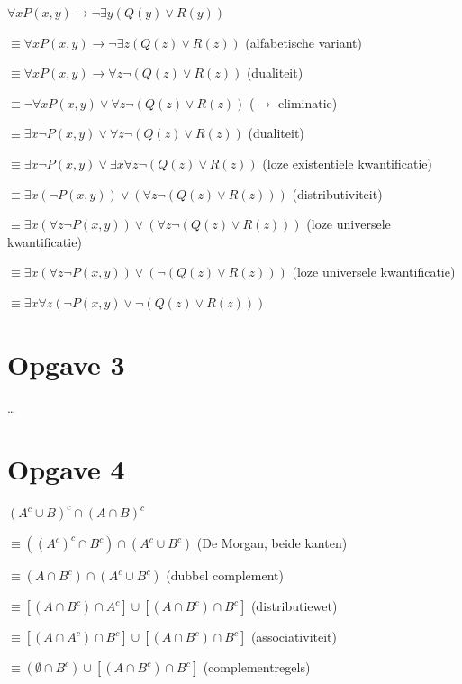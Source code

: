 \documentclass[11pt, a4paper]{article}
\begin{document}
$\forall x P(x,y) \rightarrow \neg \exists y(Q(y) \lor R(y))$

$\equiv \forall x P(x,y) \rightarrow 		\neg \exists z(Q(z) \lor R(z)) $ \hfill (alfabetische variant)

$\equiv \forall x P(x,y) \rightarrow 		\forall z \neg(Q(z) \lor R(z)) $ \hfill (dualiteit)

$\equiv \neg \forall x P(x,y) \lor 		\forall z \neg(Q(z) \lor R(z)) $ \hfill ($\rightarrow$-eliminatie)

$\equiv \exists x \neg P (x,y) \lor 		\forall z \neg(Q(z) \lor R(z)) $ \hfill (dualiteit)

$\equiv \exists x \neg P (x,y) \lor 		\exists x \forall z \neg(Q(z) \lor R(z)) $ \hfill (loze existentiele kwantificatie)

$\equiv \exists x (\neg P (x, y)) \lor (\forall z  \neg(Q(z) \lor R(z)))$ \hfill (distributiviteit)

$\equiv \exists x (\forall z \neg P (x, y)) \lor (\forall z  \neg(Q(z) \lor R(z)))$ \hfill (loze universele kwantificatie)

$\equiv \exists x (\forall z \neg P (x, y)) \lor (\neg(Q(z) \lor R(z)))$ \hfill (loze universele kwantificatie)

$\equiv \boxed{\exists x \forall z (\neg P (x, y) \lor \neg(Q(z) \lor R(z)))}$



\pagebreak
\section*{Opgave 3}
\ldots



\pagebreak
\section*{Opgave 4}

${({A}^c \cup B)}^c \cap {(A \cap B)}^c$

$\equiv  ({(A^c)}^c \cap B^c) \cap ({A}^c \cup {B}^c)$ \hfill (De Morgan, beide kanten)

$\equiv  (A \cap B^c) \cap ({A}^c \cup {B}^c)$ \hfill (dubbel complement)

$\equiv  [(A \cap B^c) \cap {A}^c] \cup [(A \cap B^c) \cap {B}^c]$ \hfill (distributiewet)

$\equiv  [(A \cap A^c) \cap {B}^c] \cup [(A \cap B^c) \cap {B}^c]$ \hfill (associativiteit)

$\equiv  (\emptyset \cap {B}^c) \cup [(A \cap B^c) \cap {B}^c]$ \hfill (complementregels)
\end{document}

